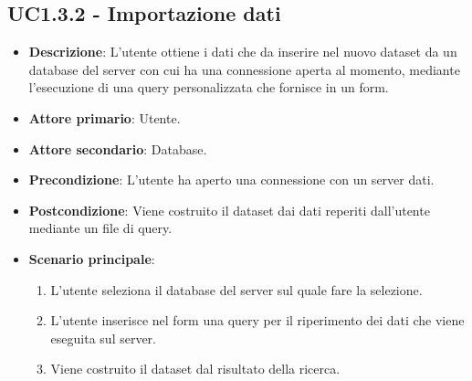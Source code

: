 \subsection{UC1.3.2 - Importazione dati}
\label{subsec:UC1.3.2}
\begin{itemize}
    \item \textbf{Descrizione}: L'utente ottiene i dati che da inserire nel nuovo dataset da un database
                                del server con cui ha una connessione aperta al momento, mediante 
                                l'esecuzione di una query personalizzata che fornisce in un form.

    \item \textbf{Attore primario}: Utente.
    
    \item \textbf{Attore secondario}: Database.
    
    \item \textbf{Precondizione}:   L'utente ha aperto una connessione con un server dati.
    \item \textbf{Postcondizione}:  Viene costruito il dataset dai dati reperiti dall'utente mediante un file di query.

	\item \textbf{Scenario principale}:
        \begin{enumerate}
            \item L'utente seleziona il database del server sul quale fare la selezione.
			\item L'utente inserisce nel form una query per il riperimento dei dati che viene eseguita sul server.
			\item Viene costruito il dataset dal risultato della ricerca.
        \end{enumerate}
\end{itemize}







